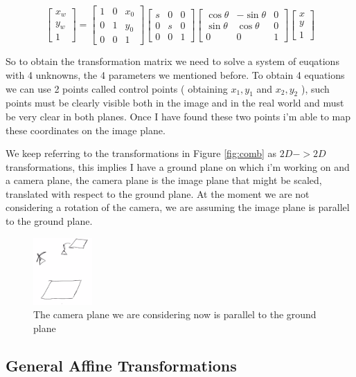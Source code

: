 \[
    \begin{bmatrix}
    x_w \\
    y_w \\
    1
    \end{bmatrix}
    =
    \begin{bmatrix}
    1 & 0 & x_0 \\
    0 & 1 & y_0 \\
    0 & 0 & 1
    \end{bmatrix}
    \begin{bmatrix}
        s & 0 & 0 \\
        0 & s & 0 \\
        0 & 0 & 1
    \end{bmatrix}
    \begin{bmatrix}
    \cos\theta & -\sin\theta & 0 \\
    \sin\theta & \cos\theta & 0 \\
    0 & 0 & 1
    \end{bmatrix}
    \begin{bmatrix}
        x \\
        y \\
        1
    \end{bmatrix}
\]

So to obtain the transformation matrix we need to solve a system of euqations with 4 unknowns, the 4 parameters we mentioned before. To obtain 4 equations we can use 2 points called control points ( obtaining \(x_1, y_1\) and \(x_2, y_2\) ), such points must be clearly visible both in the image and in the real world and must be very clear in both planes. Once I have found these two points i'm able to map these coordinates on the image plane.

We keep referring to the transformations in Figure \ref{fig:comb} as \(2D -> 2D \) transformations, this implies I have a ground plane on which i'm working on and a camera plane, the camera plane is the image plane that might be scaled, translated with respect to the ground plane. At the moment we are not considering a rotation of the camera, we are assuming the image plane is parallel to the ground plane.

\begin{figure}[H]
    \centering
    \includegraphics[width=0.2\textwidth]{Figures/planes.png}
    \caption{The camera plane we are considering now is parallel to the ground plane}
    \label{fig:planes}
\end{figure}



\subsection{General Affine Transformations}





